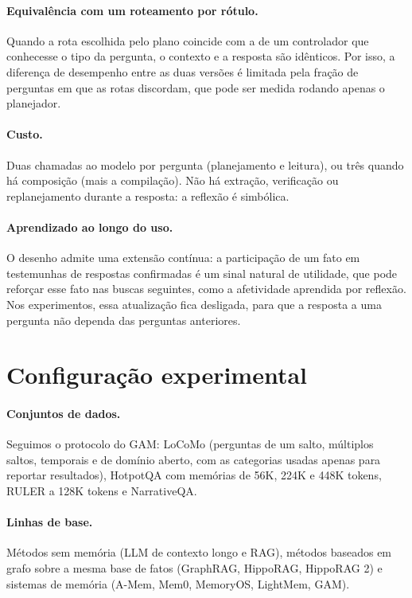 \documentclass[11pt]{article}
\begin{document}
\paragraph{Equivalência com um roteamento por rótulo.} Quando a rota escolhida
pelo plano coincide com a de um controlador que conhecesse o tipo da pergunta,
o contexto e a resposta são idênticos. Por isso, a diferença de desempenho
entre as duas versões é limitada pela fração de perguntas em que as rotas
discordam, que pode ser medida rodando apenas o planejador.

\paragraph{Custo.} Duas chamadas ao modelo por pergunta (planejamento e
leitura), ou três quando há composição (mais a compilação). Não há extração,
verificação ou replanejamento durante a resposta: a reflexão é simbólica.

\paragraph{Aprendizado ao longo do uso.} O desenho admite uma extensão
contínua: a participação de um fato em testemunhas de respostas confirmadas é
um sinal natural de utilidade, que pode reforçar esse fato nas buscas
seguintes, como a afetividade aprendida por reflexão. Nos experimentos, essa
atualização fica desligada, para que a resposta a uma pergunta não dependa das
perguntas anteriores.

\section{Configuração experimental}

\paragraph{Conjuntos de dados.} Seguimos o protocolo do GAM: LoCoMo
(perguntas de um salto, múltiplos saltos, temporais e de domínio aberto,
com as categorias usadas apenas para reportar resultados), HotpotQA com
memórias de 56K, 224K e 448K tokens, RULER a 128K tokens e NarrativeQA.

\paragraph{Linhas de base.} Métodos sem memória (LLM de contexto longo e RAG),
métodos baseados em grafo sobre a mesma base de fatos (GraphRAG, HippoRAG,
HippoRAG 2) e sistemas de memória (A-Mem, Mem0, MemoryOS, LightMem, GAM).
\end{document}
